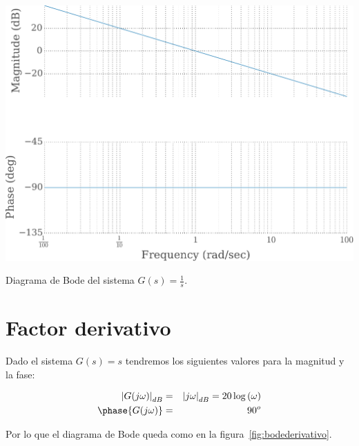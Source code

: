             \begin{marginfigure}
                \centering
                \includegraphics[width=\textwidth]{./imagenes/bodeintegral.pdf}
                \caption{\label{fig:bodeintegral}Diagrama de Bode del sistema $G(s) = \frac{1}{s}$.}
            \end{marginfigure}


        \newpage
        \section{Factor derivativo}

            Dado el sistema $G(s) = s$ tendremos los siguientes valores para la magnitud y la fase:

            \begin{eqnarray*}
                \left| G(j \omega) \right|_{dB} & = & \left| j \omega \right|_{dB} = 20 \log{(\omega)} \\
                \phase{G(j \omega)} & = & 90^o
            \end{eqnarray*}

            Por lo que el diagrama de Bode queda como en la figura~\ref{fig:bodederivativo}.


